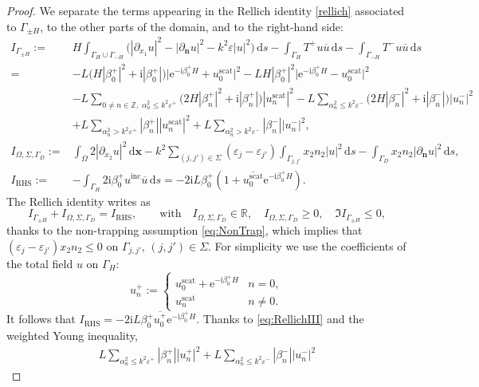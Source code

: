 \documentclass[a4paper,10pt]{article}
\newcommand{\IR}{{\mathbb R}}
\newcommand{\IZ}{{\mathbb Z}}
\newcommand{\bx}{{\mathbf x}}
\newcommand{\bn}{{\mathbf n}}
\newcommand{\ri}{{\mathrm i}}
\newcommand{\re}{{\mathrm e}}
\newcommand{\rd}{{\,\mathrm d}}
\newcommand{\inc}{{\mathrm{inc}}}
\newcommand{\scat}{{\mathrm{scat}}}
\newcommand{\dn}{{\partial_\bn}}
\newcommand{\dxo}{{\partial_{x_1}}}
\newcommand{\dxt}{{\partial_{x_2}}}
\newcommand{\cu}{{\overline{u}}}
\newcommand{\GD}{{\Gamma_D}}
\newcommand{\GH}{{\Gamma_H}}
\newcommand{\GmH}{{\Gamma_{-H}}}
\newcommand{\GpmH}{{\Gamma_{\pm H}}}
\begin{document}
\begin{proof}
We separate the terms appearing in the Rellich identity \eqref{rellich} associated to $\GpmH$, to the other parts of the domain, and to the right-hand side:
\begin{align*} \nonumber
	I_\GpmH := & H\int_{\GH\cup\GmH} \biggl( \left|\dxo u \right|^2 - \left| \dn u \right|^2 -k^2\varepsilon |u|^2 \biggr)\rd s -\int_{\GH} T^+ u\cu\rd s-\int_\GmH T^- u\cu\rd s
	\\ \nonumber
	=& 
	-L\Big(H|\beta_0^+|^2+\ri|\beta_0^+|\Big) \big|\re^{-\ri\beta_0^+ H}+u^\scat_0\big|^2
	- L H|\beta_0^+|^2\big|\re^{-\ri\beta_0^+ H}-u^\scat_0\big|^2\\ \nonumber
	&-L\sum_{0\ne n\in\IZ,\; \alpha_n^2\le k^2\varepsilon^+}\Big(2H|\beta_n^+|^2+\ri|\beta_n^+|\Big) |u^{\scat}_n|^2
	-L\sum_{ \alpha_n^2\le k^2\varepsilon^-}\Big(2H|\beta_n^-|^2+\ri|\beta_n^-|\Big)|u^-_n|^2\\ 
	&+L\sum_{\alpha^2_n > k^2\varepsilon^+} |\beta_n^+||u_n^{\scat}|^2
	+L\sum_{\alpha^2_n > k^2\varepsilon^-}|\beta_n^-||u_n^-|^2,
	\\
	I_{\Omega, \Sigma, \GD} :=& \int_\Omega 2|\dxt u|^2\rd\bx
	-k^2\sum_{(j,j')\in\Sigma} ( \varepsilon_{j} -\varepsilon_{j'} ) \int_{\Gamma_{j,j'}} x_2 n_2 |u|^2\rd s
	- \int_{\GD} x_2n_2|\dn u|^2 \rd s,
	\\
	I_{\mathrm{RHS}} :=& -\int_{\GH} 2 \ri \beta_0^+ {u^\inc} \cu \rd s
	=-2\ri L\beta_0^+ {(1+\overline{u_0^\scat} \re^{-\ri\beta_0^+H})}.
\end{align*}
The Rellich identity writes as 
\begin{equation}\label{eq:RellichIII}
	I_\GpmH+I_{\Omega, \Sigma, \GD}=I_{\mathrm{RHS}}, \qquad
	\text{with} \quad I_{\Omega, \Sigma, \GD}\in \IR, \quad
	I_{\Omega, \Sigma, \GD}\ge 0, \quad\Im I_\GpmH\le0, 
\end{equation}
thanks to the non-trapping assumption \eqref{eq:NonTrap}, which implies that $(\varepsilon_j-\varepsilon_{j'})x_2n_2\le0$ on $\Gamma_{j,j'}$, $(j,j')\in\Sigma$.
For simplicity we use the coefficients of the total field $u$ on $\GH$:
$$
u_n^+:=\begin{cases} u_0^\scat+\re^{-\ri\beta_0^+H}  & n=0,\\ u_n^\scat & n\ne0.\end{cases}
$$
It follows that $I_{\mathrm{RHS}}=-2\ri L\beta_0^+ \overline{u_0^+}\re^{-\ri\beta_0^+H}$.
Thanks to \eqref{eq:RellichIII} and the weighted Young inequality,
\begin{align*}
	L\sum_{\alpha_n^2\le k^2\varepsilon^+}|\beta_n^+||u^+_n|^2
	+L\sum_{\alpha_n^2\le k^2\varepsilon^-}|\beta_n^-||u^-_n|^2

\end{align*}
\end{proof}
\end{document}
